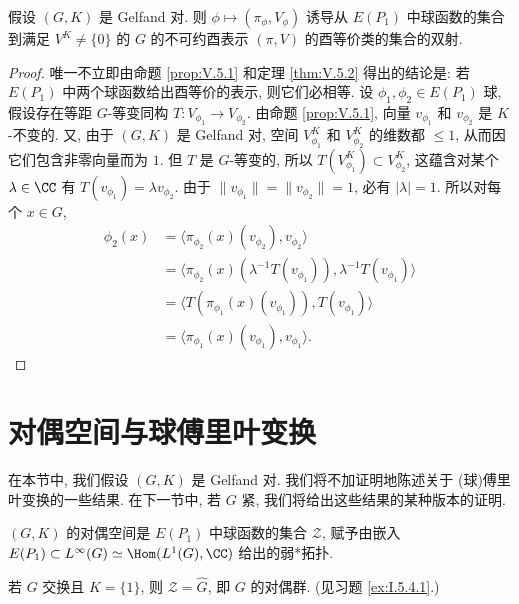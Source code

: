 \begin{corollary}[球函数与不可约表示的对应]
\label{cor:V.5.4}
假设 $(G, K)$ 是 Gelfand 对. 则 $\phi \longmapsto (\pi_{\phi}, V_{\phi})$ 诱导从 $E(P_1)$ 中球函数的集合到满足 $V^K \neq \{0\}$ 的 $G$ 的不可约酉表示 $(\pi, V)$ 的酉等价类的集合的双射.
\end{corollary}

\begin{proof}
唯一不立即由命题 \ref{prop:V.5.1} 和定理 \ref{thm:V.5.2} 得出的结论是: 若 $E(P_1)$ 中两个球函数给出酉等价的表示, 则它们必相等. 设 $\phi_1, \phi_2 \in E(P_1)$ 球, 假设存在等距 $G$-等变同构 $T \colon V_{\phi_1} \to V_{\phi_2}$. 由命题 \ref{prop:V.5.1}, 向量 $v_{\phi_1}$ 和 $v_{\phi_2}$ 是 $K$-不变的. 又, 由于 $(G, K)$ 是 Gelfand 对, 空间 $V_{\phi_1}^K$ 和 $V_{\phi_2}^K$ 的维数都 $\leq 1$, 从而因它们包含非零向量而为 $1$. 但 $T$ 是 $G$-等变的, 所以 $T(V_{\phi_1}^K) \subset V_{\phi_2}^K$, 这蕴含对某个 $\lambda \in \CC$ 有 $T(v_{\phi_1}) = \lambda v_{\phi_2}$. 由于 $\|v_{\phi_1}\| = \|v_{\phi_2}\| = 1$, 必有 $|\lambda| = 1$. 所以对每个 $x \in G$,
\begin{align*}
\phi_2(x) &= \langle \pi_{\phi_2}(x)(v_{\phi_2}), v_{\phi_2} \rangle \\
&= \langle \pi_{\phi_2}(x)(\lambda^{-1}T(v_{\phi_1})), \lambda^{-1}T(v_{\phi_1}) \rangle \\
&= \langle T(\pi_{\phi_1}(x)(v_{\phi_1})), T(v_{\phi_1}) \rangle \\
&= \langle \pi_{\phi_1}(x)(v_{\phi_1}), v_{\phi_1} \rangle.
\end{align*}
\end{proof}

\section{对偶空间与球傅里叶变换}
在本节中, 我们假设 $(G, K)$ 是 Gelfand 对. 我们将不加证明地陈述关于 (球)傅里叶变换的一些结果. 在下一节中, 若 $G$ 紧, 我们将给出这些结果的某种版本的证明.

\begin{definition}
\label{def:V.6.1}
$(G, K)$ 的对偶空间是 $E(P_1)$ 中球函数的集合 $\mathcal{Z}$, 赋予由嵌入 $E(P_1) \subset L^{\infty}(G) \simeq \Hom(L^1(G), \CC)$ 给出的弱*拓扑.
\end{definition}

\begin{example}[交换群的情形]
\label{exa:V.6.2}
若 $G$ 交换且 $K = \{1\}$, 则 $\mathcal{Z} = \widehat{G}$, 即 $G$ 的对偶群. (见习题 \ref{ex:I.5.4.1}.)
\end{example}

